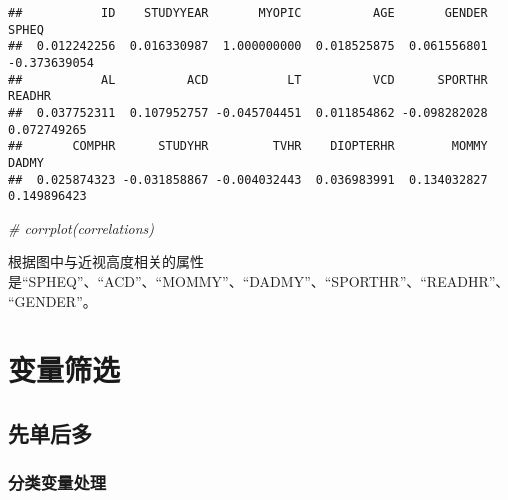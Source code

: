 \documentclass[]{ctexbook}
\newenvironment{Shaded}{\begin{snugshade}}{\end{snugshade}}
\newcommand{\CommentTok}[1]{\textcolor[rgb]{0.56,0.35,0.01}{\textit{#1}}}
\begin{document}
\begin{verbatim}
##           ID    STUDYYEAR       MYOPIC          AGE       GENDER        SPHEQ 
##  0.012242256  0.016330987  1.000000000  0.018525875  0.061556801 -0.373639054 
##           AL          ACD           LT          VCD      SPORTHR       READHR 
##  0.037752311  0.107952757 -0.045704451  0.011854862 -0.098282028  0.072749265 
##       COMPHR      STUDYHR         TVHR    DIOPTERHR        MOMMY        DADMY 
##  0.025874323 -0.031858867 -0.004032443  0.036983991  0.134032827  0.149896423
\end{verbatim}

\begin{Shaded}
\begin{Highlighting}[]
 \CommentTok{\# corrplot(correlations)}
\end{Highlighting}
\end{Shaded}

根据图中与近视高度相关的属性是``SPHEQ''、``ACD''、``MOMMY''、``DADMY''、``SPORTHR''、``READHR''、``GENDER''。

\hypertarget{ux53d8ux91cfux7b5bux9009}{%
\chapter{变量筛选}\label{ux53d8ux91cfux7b5bux9009}}

\hypertarget{ux5148ux5355ux540eux591a}{%
\section{先单后多}\label{ux5148ux5355ux540eux591a}}

\hypertarget{ux5206ux7c7bux53d8ux91cfux5904ux7406}{%
\subsection{分类变量处理}\label{ux5206ux7c7bux53d8ux91cfux5904ux7406}}
\end{document}
